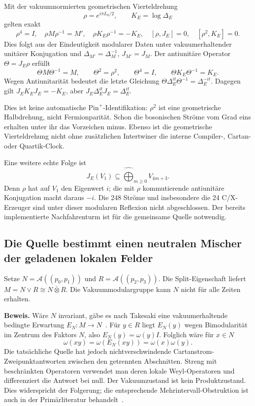 Mit der vakuumnormierten geometrischen Vierteldrehung
\begin{equation}
\rho=e^{i\pi L_0/2},\qquad K_E=\log\Delta_E
\end{equation}
gelten exakt
\begin{equation}\label{eq:nativequarter}
\rho^4=I,\quad \rho M\rho^{-1}=M',\quad
\rho K_E\rho^{-1}=-K_E,\quad
[\rho,J_E]=0,\quad[\rho^2,K_E]=0.
\end{equation}
Dies folgt aus der Eindeutigkeit modularer Daten unter vakuumerhaltender unitärer Konjugation und $\Delta_{M'}=\Delta_M^{-1}$, $J_{M'}=J_M$.
Der antiunitäre Operator $\Theta=J_E\rho$ erfüllt
\begin{equation}
\Theta M\Theta^{-1}=M,\qquad
\Theta^2=\rho^2,\qquad \Theta^4=I,\qquad
\Theta K_E\Theta^{-1}=K_E.
\end{equation}
Wegen Antiunitarität bedeutet die letzte Gleichung
$\Theta\Delta_E^{it}\Theta^{-1}=\Delta_E^{-it}$.
Dagegen gilt $J_EK_EJ_E=-K_E$, aber $J_E\Delta_E^{it}J_E=\Delta_E^{it}$.

Dies ist keine automatische $\mathrm{Pin}^+$-Identifikation:
$\rho^2$ ist eine geometrische Halbdrehung, nicht Fermionparität.
Schon die bosonischen Ströme vom Grad eins erhalten unter ihr das Vorzeichen minus.
Ebenso ist die geometrische Vierteldrehung nicht ohne zusätzlichen Intertwiner die interne Compiler-, Cartan- oder Quartik-Clock.

Eine weitere echte Folge ist
\begin{equation}
J_E(V_1)\subseteq\widehat{\bigoplus}_{m\ge0}V_{4m+3}.
\end{equation}
Denn $\rho$ hat auf $V_1$ den Eigenwert $i$; die mit $\rho$ kommutierende antiunitäre Konjugation macht daraus $-i$. Die 248 Ströme und insbesondere die 24 C/X-Erzeuger sind unter dieser modularen Reflexion nicht abgeschlossen. Der bereits implementierte Nachfahrenturm ist für die gemeinsame Quelle notwendig.

\subsection{Die Quelle bestimmt einen neutralen Mischer der geladenen lokalen Felder}
Setze $N=\mathcal A((p_0,p_1))$ und $R=\mathcal A((p_2,p_3))$.
Die Split-Eigenschaft liefert $M=N\vee R\cong N\bar\otimes R$.
Die Vakuummodulargruppe kann $N$ nicht für alle Zeiten erhalten.

\textbf{Beweis.} Wäre $N$ invariant, gäbe es nach Takesaki eine vakuumerhaltende bedingte Erwartung $E_N:M\to N$~\cite{takesakiexpectation}. Für $y\in R$ liegt $E_N(y)$ wegen Bimodularität im Zentrum des Faktors $N$, also $E_N(y)=\omega(y)I$. Folglich wäre für $x\in N$
\begin{equation}
\omega(xy)=\omega(E_N(xy))=\omega(x)\omega(y).
\end{equation}
Die tatsächliche Quelle hat jedoch nichtverschwindende Cartanstrom-Zweipunktantworten zwischen den getrennten Abschnitten. Streng mit beschränkten Operatoren verwendet man deren lokale Weyl-Operatoren und differenziert die Antwort bei null. Der Vakuumzustand ist kein Produktzustand. Dies widerspricht der Folgerung; die entsprechende Mehrintervall-Obstruktion ist auch in der Primärliteratur behandelt~\cite{longomodular}.

